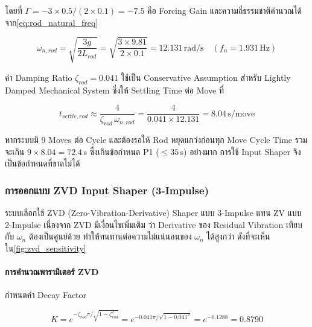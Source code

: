 \noindent โดยที่ $\Gamma = -3 \times 0.5 / (2 \times 0.1) = -7.5$
คือ Forcing Gain และความถี่ธรรมชาติคำนวณได้จาก\cref{eq:rod_natural_freq}

\begin{equation}
    \omega_{n,rod} = \sqrt{\frac{3g}{2L_{rod}}}
                   = \sqrt{\frac{3 \times 9.81}{2 \times 0.1}}
                   = 12.131\,\text{rad/s}
                   \quad (f_n = 1.931\,\text{Hz})
    \label{eq:rod_wn_ch3}
\end{equation}

ค่า Damping Ratio $\zeta_{rod} = 0.041$ ใช้เป็น Conservative Assumption
สำหรับ Lightly Damped Mechanical System
ซึ่งให้ Settling Time ต่อ Move ที่

\begin{equation}
    t_{settle,rod} \approx \frac{4}{\zeta_{rod}\,\omega_{n,rod}}
                         = \frac{4}{0.041 \times 12.131}
                         = 8.04\,\text{s/move}
    \label{eq:rod_settle}
\end{equation}

หากระบบมี 9 Moves ต่อ Cycle และต้องรอให้ Rod หยุดแกว่งก่อนทุก Move
Cycle Time รวมจะเกิน $9 \times 8.04 = 72.4$\,s
ซึ่งเกินข้อกำหนด P1 ($\leq 35$\,s) อย่างมาก
การใช้ Input Shaper จึงเป็นข้อกำหนดที่ขาดไม่ได้

\subsubsection{การออกแบบ ZVD Input Shaper (3-Impulse)}
\label{subsubsec:zvd_design}

ระบบเลือกใช้ ZVD (Zero-Vibration-Derivative) Shaper แบบ 3-Impulse
แทน ZV แบบ 2-Impulse เนื่องจาก ZVD มีเงื่อนไขเพิ่มเติม
ว่า Derivative ของ Residual Vibration เทียบกับ $\omega_n$
ต้องเป็นศูนย์ด้วย ทำให้ทนทานต่อความไม่แน่นอนของ $\omega_n$
ได้สูงกว่า ดังที่จะเห็นใน\cref{fig:zvd_sensitivity}

\paragraph{การคำนวณพารามิเตอร์ ZVD}

กำหนดค่า Decay Factor

\begin{equation}
    K = e^{-\zeta_{rod}\pi/\sqrt{1-\zeta_{rod}^2}}
      = e^{-0.041\pi/\sqrt{1-0.041^2}}
      = e^{-0.1288}
      = 0.8790
    \label{eq:zvd_K}
\end{equation}

